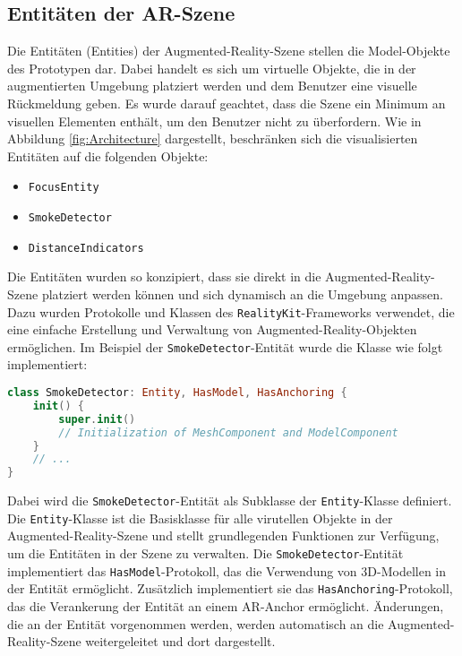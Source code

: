 \subsection{Entitäten der AR-Szene}

Die Entitäten (Entities) der Augmented-Reality-Szene stellen die Model-Objekte des Prototypen dar. Dabei handelt es sich um virtuelle Objekte, die in der augmentierten Umgebung platziert werden und dem Benutzer eine visuelle Rückmeldung geben. Es wurde darauf geachtet, dass die Szene ein Minimum an visuellen Elementen enthält, um den Benutzer nicht zu überfordern. Wie in Abbildung \ref{fig:Architecture} dargestellt, beschränken sich die visualisierten Entitäten auf die folgenden Objekte:

\begin{itemize}
    \item \texttt{FocusEntity}
    \item \texttt{SmokeDetector}
    \item \texttt{DistanceIndicators}
\end{itemize}

Die Entitäten wurden so konzipiert, dass sie direkt in die Augmented-Reality-Szene platziert werden können und sich dynamisch an die Umgebung anpassen. Dazu wurden Protokolle und Klassen des \texttt{RealityKit}-Frameworks verwendet, die eine einfache Erstellung und Verwaltung von Augmented-Reality-Objekten ermöglichen. Im Beispiel der \texttt{SmokeDetector}-Entität wurde die Klasse wie folgt implementiert:

\begin{lstlisting}[language=Swift]
class SmokeDetector: Entity, HasModel, HasAnchoring {
    init() {
        super.init()
        // Initialization of MeshComponent and ModelComponent
    }
    // ...
}
\end{lstlisting}

Dabei wird die \texttt{SmokeDetector}-Entität als Subklasse der \texttt{Entity}-Klasse definiert. Die \texttt{Entity}-Klasse ist die Basisklasse für alle virutellen Objekte in der Augmented-Reality-Szene und stellt grundlegenden Funktionen zur Verfügung, um die Entitäten in der Szene zu verwalten. Die \texttt{SmokeDetector}-Entität implementiert das \texttt{HasModel}-Protokoll, das die Verwendung von 3D-Modellen in der Entität ermöglicht. Zusätzlich implementiert sie das \texttt{HasAnchoring}-Protokoll, das die Verankerung der Entität an einem AR-Anchor ermöglicht. Änderungen, die an der Entität vorgenommen werden, werden automatisch an die Augmented-Reality-Szene weitergeleitet und dort dargestellt.


